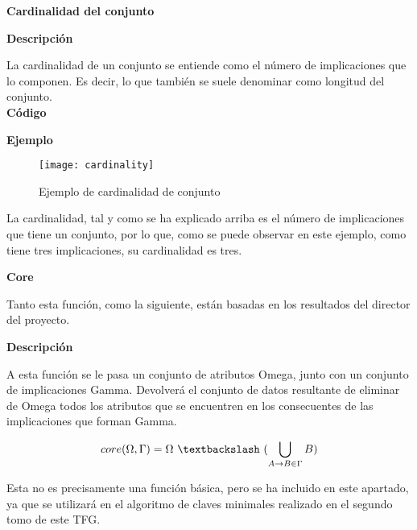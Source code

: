     

    \clearpage

\textbf{ \large Cardinalidad del conjunto}

\smallskip

    \textbf{Descripci\'on}

    La cardinalidad de un conjunto se entiende como el n\'umero de implicaciones que lo componen. Es decir, lo que 
    tambi\'en se suele denominar como longitud del conjunto.
    \\


    \textbf{C\'odigo}

    
    \bigskip

    \textbf{Ejemplo}


    \begin{figure}[H]
        \centering
        \texttt{[image: cardinality]}
        \caption{Ejemplo de cardinalidad de conjunto}
        \label{fig:cardinality}
    \end{figure}

    La cardinalidad, tal y como se ha explicado arriba es el n\'umero de implicaciones que tiene un conjunto, por lo que, como 
    se puede observar en este ejemplo, como tiene tres implicaciones, su cardinalidad es tres.
     

    \clearpage

\textbf{ \large Core}

\smallskip

Tanto esta funci\'on, como la siguiente, est\'an basadas en los resultados del director del proyecto\cite{corebody}.

\smallskip

    \textbf{Descripci\'on}

    A esta funci\'on se le pasa un conjunto de atributos Omega, junto con un conjunto de implicaciones Gamma. 
    Devolver\'a el conjunto de datos resultante de eliminar de Omega todos los atributos que se encuentren en los 
    consecuentes de las implicaciones que forman Gamma. 

    \[
        core(\Omega , \Gamma ) = \Omega ~ \textbackslash ~ ( \bigcup_{A \to B \in \Gamma} B )    
    \]
    
    Esta no es precisamente una funci\'on b\'asica, pero se ha incluido en este apartado, ya que se utilizar\'a 
    en el algoritmo de claves minimales realizado en el segundo tomo de este TFG.
    \\

